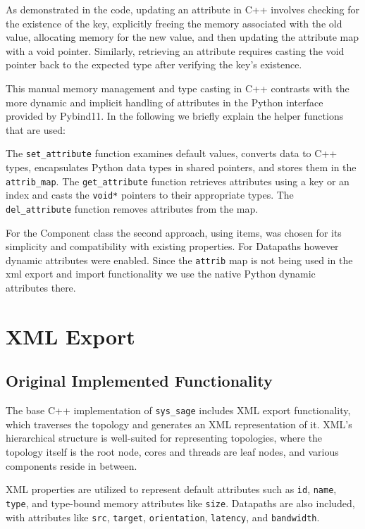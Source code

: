As demonstrated in the code, updating an attribute in C++ involves checking for the existence of the key, explicitly freeing the memory associated with the old value, allocating memory for the new value, and then updating the attribute map with a void pointer. Similarly, retrieving an attribute requires casting the void pointer back to the expected type after verifying the key's existence.\cite{sys-sage-docu} 

This manual memory management and type casting in C++ contrasts with the more dynamic and implicit handling of attributes in the Python interface provided by Pybind11.
In the following we briefly explain the helper functions that are used:

The \verb|set_attribute| function examines default values, converts data to C++ types, encapsulates Python data types in shared pointers, and stores them in the \verb|attrib_map|. The \verb|get_attribute| function retrieves attributes using a key or an index and casts the \verb|void*| pointers to their appropriate types. The \verb|del_attribute| function removes attributes from the map.

For the Component class the second approach, using items, was chosen for its simplicity and compatibility with existing properties. For Datapaths however dynamic attributes were enabled. Since the \verb|attrib| map is not being used in the xml export and import functionality we use the native Python dynamic attributes there.

\section{XML Export}

\subsection{Original Implemented Functionality}

The base C++ implementation of \verb|sys_sage| includes XML export functionality, which traverses the topology and generates an XML representation of it. XML's hierarchical structure is well-suited for representing topologies, where the topology itself is the root node, cores and threads are leaf nodes, and various components reside in between.

XML properties are utilized to represent default attributes such as \verb|id|, \verb|name|, \verb|type|, and type-bound memory attributes like \verb|size|. Datapaths are also included, with attributes like \verb|src|, \verb|target|, \verb|orientation|, \verb|latency|, and \verb|bandwidth|.

